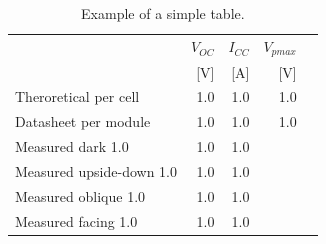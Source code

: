 \begin{table}[!htb]
        \centering
        \footnotesize
        \caption{Example of a simple table.}
         \begin{tabular}{lrrrr}
          \toprule
             & $V_{OC}$ & $I_{CC}$ & $V_{pmax}$ \\
             &  [V]  & [A] & [V]\\
          \midrule
          Theroretical per cell & 1.0      & 1.0 & 1.0 \\
          Datasheet  per module &  1.0      & 1.0 & 1.0 \\
          Measured dark  1.0      & 1.0 & 1.0 \\
          Measured upside-down  1.0      & 1.0 & 1.0 \\
          Measured oblique  1.0      & 1.0 & 1.0 \\
          Measured facing  1.0      & 1.0 & 1.0 \\
          \bottomrule
        \end{tabular}
     \label{tab:PVresults}
\end{table}
